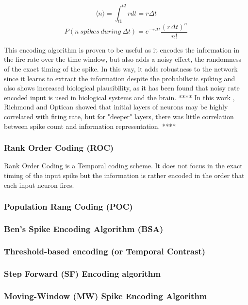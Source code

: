 \documentclass[12pt]{report}
\begin{document}
\begin{equation}
    \langle n \rangle = \int_{t1}^{t2}rdt = r\Delta t
\end{equation}
\begin{equation}
    P(n\:spikes\:during\:\Delta t) = e^{-r\Delta t}\frac{(r\Delta t)^n}{n!}
\end{equation}

This encoding algorithm is proven to be useful as it encodes the information in the fire rate over the time window, but also adds a noisy effect, the randomness of the exact timing of the spike. In this way, it adds robustness to the network since it learns to extract the information despite the probabilistic spiking and also shows increased biological plausibility, as it has been found that noisy rate encoded input is used in biological systems and the brain.
****
In this work \cite{Richmond1987}, Richmond and Optican showed that initial layers of neurons may be highly correlated with firing rate, but for "deeper" layers, there was little correlation between spike count and information representation. 
****

\subsubsection{Rank Order Coding (ROC)}

Rank Order Coding is a Temporal coding scheme. It does not focus in the exact timing of the input spike but the information is rather encoded in the order that each input neuron fires.

\subsubsection{Population Rang Coding (POC)}
\subsubsection{Ben’s Spike Encoding Algorithm (BSA)}
\subsubsection{Threshold-based encoding (or Temporal Contrast)}
\subsubsection{Step Forward (SF) Encoding algorithm}
\subsubsection{Moving-Window (MW) Spike Encoding Algorithm}
\end{document}
